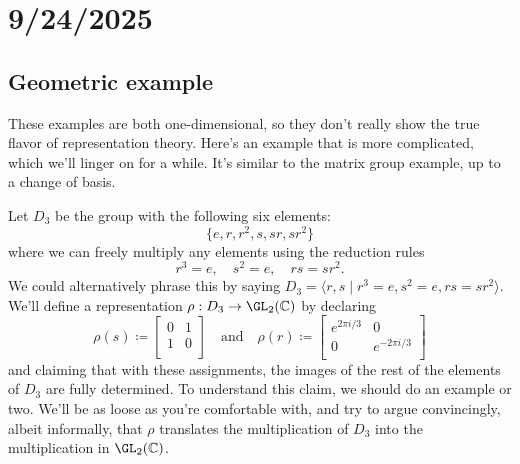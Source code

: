 \section{9/24/2025}


\subsection{Geometric example}
These examples are both one-dimensional, so they don't really show the true flavor of representation theory. 
Here's an example that is more complicated, which we'll linger on for a while.
It's similar to the matrix group example, up to a change of basis.

Let $D_3$ be the group with the following six elements:
\[
    \{ e, r, r^2, s, sr, sr^2 \}
\]
where we can freely multiply any elements using the reduction rules
\[
    r^3 = e, \quad s^2 = e, \quad rs = sr^2.
\]
We could alternatively phrase this by saying $D_3 = \langle r,s \mid r^3 = e, s^2 = e, rs = sr^2 \rangle$.
We'll define a representation $\rho: D_3 \to \GL_2(\C)$ by declaring
\[
    \rho(s) \coloneq \begin{bmatrix}
        0 & 1 \\
        1 & 0 \\    
    \end{bmatrix}
    \quad \text{and} \quad
    \rho(r) \coloneq \begin{bmatrix}
        e^{2\pi i/3} & 0\\
        0 & e^{-2\pi i/3} \\
    \end{bmatrix}
\]
and claiming that with these assignments, the images of the rest of the elements of $D_3$ are fully determined.
To understand this claim, we should do an example or two.
We'll be as loose as you're comfortable with, and try to argue convincingly, albeit informally,
that $\rho$ translates the multiplication of $D_3$ into the multiplication in $\GL_2(\C)$.

